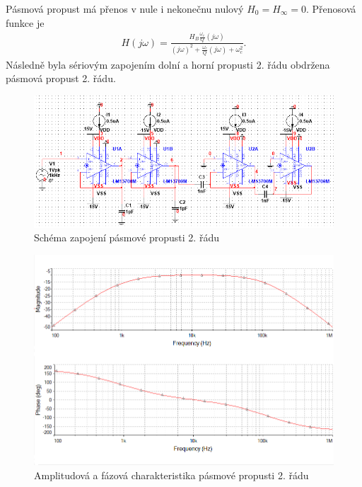 \documentclass[twoside]{article}
\begin{document}
Pásmová propust má přenos v nule i nekonečnu nulový $H_{0} = H_{\infty} = 0$. Přenosová funkce je
\begin{align}
H(j\omega) = \frac{H_{B} \frac{\omega _c}{Q} (j\omega) }{(j\omega)^2 + \frac{\omega _c}{Q}(j\omega) + \omega _c ^2}.
\end{align}
\noindent Následně byla sériovým zapojením dolní a horní propusti 2. řádu obdržena pásmová propust 2. řádu.
\begin{figure}[H]
\centering
\includegraphics[scale=0.75]{16064.png}
\caption{Schéma zapojení pásmové propusti 2. řádu}
\end{figure}
\begin{figure}[H]
\centering
\includegraphics[scale=0.75]{16065.png}
\caption{Amplitudová a fázová charakteristika pásmové propusti 2. řádu}
\end{figure}
\end{document}
